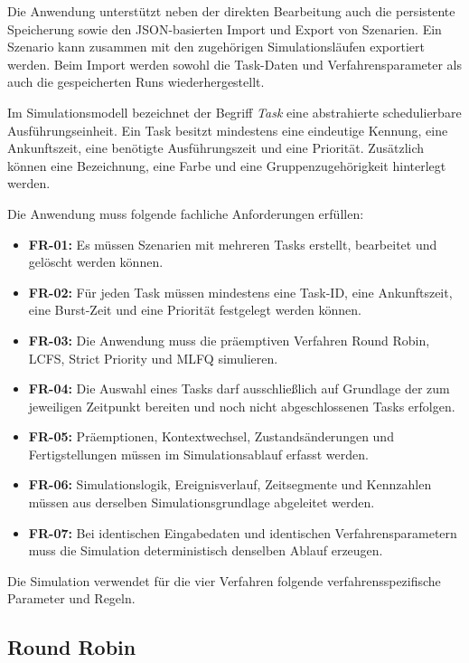 Die Anwendung unterstützt neben der direkten Bearbeitung auch die persistente Speicherung sowie den JSON-basierten Import und Export von Szenarien. Ein Szenario kann zusammen mit den zugehörigen Simulationsläufen exportiert werden. Beim Import werden sowohl die Task-Daten und Verfahrensparameter als auch die gespeicherten Runs wiederhergestellt.

Im Simulationsmodell bezeichnet der Begriff \textit{Task} eine abstrahierte schedulierbare Ausführungseinheit. Ein Task besitzt mindestens eine eindeutige Kennung, eine Ankunftszeit, eine benötigte Ausführungszeit und eine Priorität. Zusätzlich können eine Bezeichnung, eine Farbe und eine Gruppenzugehörigkeit hinterlegt werden.

Die Anwendung muss folgende fachliche Anforderungen erfüllen:

\begin{itemize}
    \item \textbf{FR-01:} Es müssen Szenarien mit mehreren Tasks erstellt, bearbeitet und gelöscht werden können.
    \item \textbf{FR-02:} Für jeden Task müssen mindestens eine Task-ID, eine Ankunftszeit, eine Burst-Zeit und eine Priorität festgelegt werden können.
    \item \textbf{FR-03:} Die Anwendung muss die präemptiven Verfahren Round Robin, LCFS, Strict Priority und MLFQ simulieren.
    \item \textbf{FR-04:} Die Auswahl eines Tasks darf ausschließlich auf Grundlage der zum jeweiligen Zeitpunkt bereiten und noch nicht abgeschlossenen Tasks erfolgen.
    \item \textbf{FR-05:} Präemptionen, Kontextwechsel, Zustandsänderungen und Fertigstellungen müssen im Simulationsablauf erfasst werden.
    \item \textbf{FR-06:} Simulationslogik, Ereignisverlauf, Zeitsegmente und Kennzahlen müssen aus derselben Simulationsgrundlage abgeleitet werden.
    \item \textbf{FR-07:} Bei identischen Eingabedaten und identischen Verfahrensparametern muss die Simulation deterministisch denselben Ablauf erzeugen.
\end{itemize}

Die Simulation verwendet für die vier Verfahren folgende verfahrensspezifische Parameter und Regeln.

\subsection{Round Robin}

